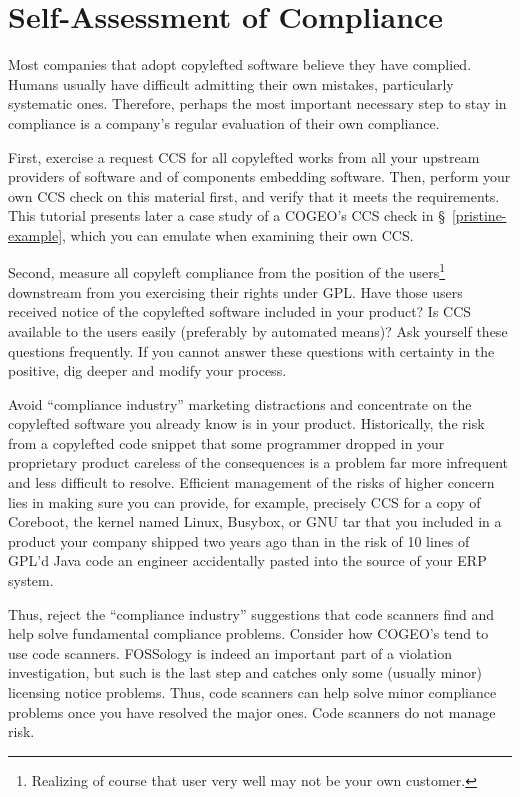 \section{Self-Assessment of Compliance}

Most companies that adopt copylefted software believe they have complied.
Humans usually have difficult admitting their own mistakes, particularly
systematic ones.  Therefore, perhaps the most important necessary step to
stay in compliance is a company's regular evaluation of their own compliance.

First, exercise a request CCS for all copylefted works from all your upstream
providers of software and of components embedding software.  Then, perform
your own CCS check on this material first, and verify that it meets the
requirements.  This tutorial presents later a case study of a COGEO's CCS
check in \S~\ref{pristine-example}, which you can emulate when examining
their own CCS\@.

Second, measure all copyleft compliance from the position of the
users\footnote{Realizing of course that user very well may not be your own
  customer.} downstream from you exercising their rights under GPL\@.  Have
those users received notice of the copylefted software included in your
product?  Is CCS available to the users easily (preferably by automated
means)?  Ask yourself these questions frequently.  If you cannot answer these
questions with certainty in the positive, dig deeper and modify your process.

Avoid ``compliance industry'' marketing distractions and concentrate on the
copylefted software you already know is in your product.  Historically, the
risk from a copylefted code snippet that some programmer dropped in your
proprietary product careless of the consequences is a problem far more
infrequent and less difficult to resolve.  Efficient management of the risks
of higher concern lies in making sure you can provide, for example, precisely
CCS for a copy of Coreboot, the kernel named Linux, Busybox, or GNU tar that
you included in a product your company shipped two years ago than in the risk
of 10 lines of GPL'd Java code an engineer accidentally pasted into the
source of your ERP system.

Thus, reject the ``compliance industry'' suggestions that code scanners find
and help solve fundamental compliance problems.  Consider how COGEO's tend to
use code scanners.  FOSSology is indeed an important part of a violation
investigation, but such is the last step and catches only some (usually
minor) licensing notice problems.  Thus, code scanners can help solve minor
compliance problems once you have resolved the major ones.  Code scanners
do not manage risk.

